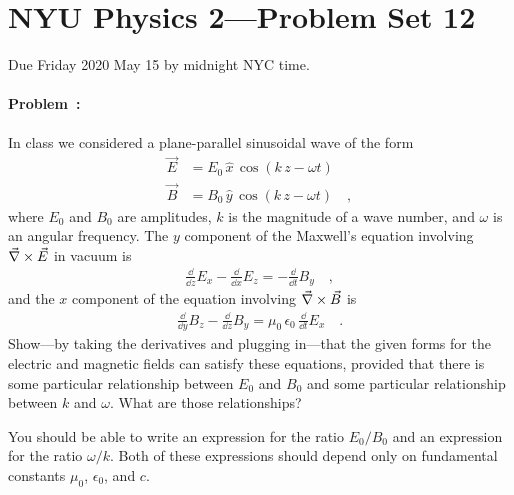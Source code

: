 \documentclass[12pt]{article}
\begin{document}
\section*{NYU Physics 2---Problem Set 12}

Due Friday 2020 May 15 by midnight NYC time.

\paragraph{Problem~\theproblem:}\label{prob:wave}%
In class we considered a plane-parallel sinusoidal wave of the form
\begin{align}
  \vec{E} &= E_0\,\hat{x}\,\cos(k\,z - \omega t) \\
  \vec{B} &= B_0\,\hat{y}\,\cos(k\,z - \omega t) \quad ,
\end{align}
where $E_0$ and $B_0$ are amplitudes, $k$ is the magnitude of a
wave number, and $\omega$ is an angular frequency.
The $y$ component of the Maxwell's equation involving
$\vec{\nabla}\times{\vec{E}}$ in vacuum is
\begin{align}
  \frac{\dd}{\dd z}E_x - \frac{\dd}{\dd x}E_z = -\frac{\dd}{\dd t}B_y
  \quad ,
\end{align}
and the $x$ component of the equation involving $\vec{\nabla}\times{\vec{B}}$ is
\begin{align}
  \frac{\dd}{\dd y}B_z - \frac{\dd}{\dd z}B_y = \mu_0\,\epsilon_0\,\frac{\dd}{\dd t}E_x
  \quad .
\end{align}
Show---by taking the derivatives and plugging in---that the given forms
for the electric and magnetic fields can
satisfy these equations, provided that there is some particular relationship
between $E_0$ and $B_0$ and some particular relationship between $k$ and $\omega$.
What are those relationships?

You should be able to write an
expression for the ratio $E_0/B_0$ and an expression for the ratio $\omega/k$.
Both of these expressions should depend only on fundamental constants
$\mu_0$, $\epsilon_0$, and $c$.
\end{document}

